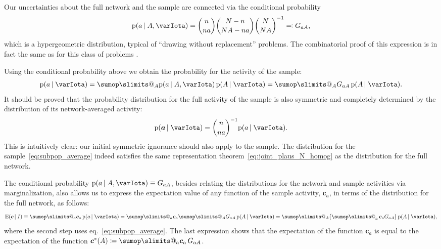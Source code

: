 \documentclass[\ifafour a4paper,12pt,\else a5paper,10pt,\fi%
onecolumn,oneside,article,%
british%
]{memoir}
\makeatletter
\theoremstyle{remark}
\theoremstyle{innote}
\def\sum{\DOTSI\sumop\slimits@}
\newcommand*{\citep}{\parencites}
\newcommand*{\defd}{\coloneqq}
\newcommand*{\defs}{\eqqcolon}
\newcommand*{\pf}{\mathrm{p}}%
\newcommand*{\p}{\mathrm{P}}%
\newcommand*{\E}{\mathrm{E}}
\renewcommand*{\|}{\nonscript\,\vert\nonscript\;\mathopen{}}
\newcommand*{\sect}{\S}%
\newcommand*{\chap}{ch.}%
\newcommand*{\eqn}{eq.}%
\newcommand*{\tsum}{\mathop{\textstyle\sum}\nolimits}
\newcommand*{\ypp}{G}
\newcommand*{\yAv}{A}
\newcommand*{\yav}{a}
\newcommand*{\yNv}{N}
\newcommand*{\yaa}{\bm{\yav}}%
\newcommand*{\ya}{\yav}%
\newcommand*{\yA}{\yAv}%
\newcommand*{\yH}{\varIota}
\newcommand*{\yg}{\bm{c}}
\makeatother
\begin{document}
Our uncertainties about the full network and the sample are connected
via the conditional probability
\begin{equation}
  \label{eq:conditional_hypergeometric}
  \pf(\ya \|\yA, \yH)=
  \binom{n}{n\ya}\binom{\yNv-n}{\yNv \yA-n\ya}\binom{\yNv}{\yNv \yA}^{-1}
  \defs \ypp_{\ya\yA},
\end{equation}
which is a hypergeometric distribution, typical of \enquote{drawing without
  replacement} problems. The combinatorial proof of this expression is in
fact the same as for this class of problems
\citep[\chap~3]{jaynes1994_r2003}[\sect~4.8.3]{ross1976_r2010}[\sect~II.6]{feller1950_r1968}.

Using the conditional probability above we obtain the probability for the
activity of the sample:
\begin{gather}
  \label{eq:subpop_average}
  \pf(\ya \| \yH) = \sum_{\yA}
  \pf(\ya \|\yA, \yH)\,
  \pf(\yA \| \yH)
  = 
  \sum_{\yA}
  \ypp_{\ya\yA}\,
  \pf(\yA \| \yH).
\end{gather}
It should be proved that the probability distribution for the full activity
of the sample is also symmetric and completely determined by the
distribution of its network-averaged activity:
\begin{equation}
  \label{eq:marginal}
  \pf(\yaa \| \yH) = \binom{n}{n\ya}^{-1} \pf(\ya \| \yH).
\end{equation}
This is intuitively clear: our initial symmetric ignorance should also
apply to the sample. The distribution for the
sample~\eqref{eq:subpop_average} indeed satisfies the same representation
theorem~\eqref{eq:joint_plaus_N_homog} as the distribution for the full
network.

The conditional probability
$\pf(\ya \|\yA, \yH) \equiv \ypp_{\ya \yA}$, besides
relating the distributions for the network and sample activities via
marginalization, also allows us to express the expectation value of any
function of the sample activity, $\yg_{\ya}$, in terms of the distribution
for the full network, as follows:
\begin{equation}
  \label{eq:pullback_P}
  \E(\yg\|I)
  \equiv
  \sum_{\ya} \yg_{\ya}\,\pf(\ya \| \yH)
  =
  \sum_{\ya} \yg_{\ya} \sum_{\yA} \ypp_{\ya\yA}\,\pf(\yA \| \yH)
  =%
  \sum_{\yA} \bigl( \tsum_{\ya} \yg_{\ya}  \ypp_{\ya\yA} \bigr)\,
  \pf(\yA \| \yH),
\end{equation}
where the second step uses \eqn~\eqref{eq:subpop_average}. The last
expression shows that the expectation of the function $\yg_{\ya}$ is equal to
the expectation of the function
$\yg^*(\yA) \defd \sum_{\ya} \yg_{\ya}\,\ypp_{\ya\yA}$.
\end{document}
